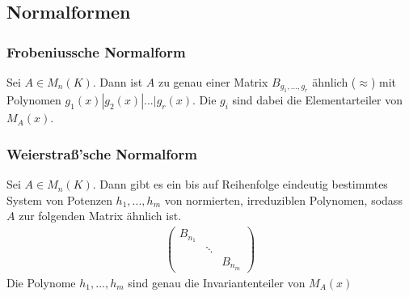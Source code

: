 \subsection{Normalformen}
\subsubsection{Frobeniussche Normalform}
\begin{theorem}
Sei $A \in M_n(K)$. Dann ist $A$ zu genau einer Matrix $B_{g_1,...,g_r}$ ähnlich ($\approx$) mit Polynomen $g_1(x) | g_2(x)| ... | g_r(x)$. Die $g_i$ sind dabei die Elementarteiler von $M_A(x)$.
\end{theorem}
\subsubsection{Weierstraß'sche Normalform}
\begin{theorem}
Sei $A \in M_n(K)$. Dann gibt es ein bis auf Reihenfolge eindeutig bestimmtes System von Potenzen $h_1,...,h_m$ von normierten, irreduziblen Polynomen, sodass $A$ zur folgenden Matrix ähnlich ist.
\begin{align*}
\begin{pmatrix}
B_{n_1} &        & \\
        & \ddots & \\
        &		  & B_{n_m}
\end{pmatrix}
\end{align*}
Die Polynome $h_1,...,h_m$ sind genau die Invariantenteiler von $M_A(x)$
\end{theorem}

